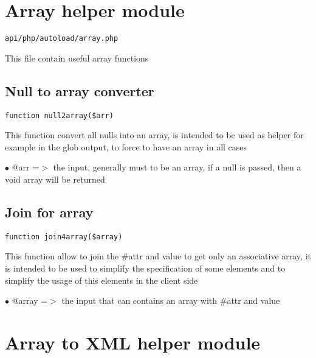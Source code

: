 \documentclass[a4paper]{book}
\begin{document}
\hypertarget{toc34}{}
\section{Array helper module}

\begin{lstlisting}
api/php/autoload/array.php
\end{lstlisting}

This file contain useful array functions

\hypertarget{toc35}{}
\subsection{Null to array converter}

\begin{lstlisting}
function null2array($arr)
\end{lstlisting}

This function convert all nulls into an array, is intended to be
used as helper for example in the glob output, to force to have
an array in all cases

\begin{compactitem}
\item[\color{myblue}$\bullet$] @arr =$>$ the input, generally must to be an array, if a null is passed,
        then a void array will be returned
\end{compactitem}

\hypertarget{toc36}{}
\subsection{Join for array}

\begin{lstlisting}
function join4array($array)
\end{lstlisting}

This function allow to join the \#attr and value to get only an associative
array, it is intended to be used to simplify the specification of some elements
and to simplify the usage of this elements in the client side

\begin{compactitem}
\item[\color{myblue}$\bullet$] @array =$>$ the input that can contains an array with \#attr and value
\end{compactitem}

\hypertarget{toc37}{}
\section{Array to XML helper module}
\end{document}
